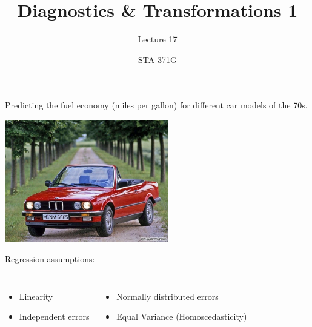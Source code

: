 \documentclass{beamer}\usepackage[]{graphicx}\usepackage[]{color}
\title{Diagnostics \& Transformations 1}
\subtitle{Lecture 17}
\author{STA 371G}
\begin{document}
  
  

  \frame{\maketitle}



  \begin{darkframes}
    
    
    \begin{frame}
      \fontsize{9}{9}\selectfont
      Predicting the fuel economy (miles per gallon) for different car models of the 70s.
      
      \begin{center}
        \includegraphics[width=2.8in]{bmw} \\
      \end{center} \pause
      
      Regression assumptions:
      \begin{columns}[onlytextwidth]
          \begin{itemize}
            \item Linearity
            \item Independent errors
          \end{itemize}
          \begin{itemize}
            \item Normally distributed errors
            \item Equal Variance (Homoscedasticity)
          \end{itemize}
      \end{columns}
    \end{frame}
    

\end{darkframes}
\end{document}
